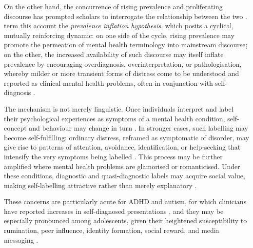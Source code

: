 On the other hand, the concurrence of rising prevalence and proliferating discourse has prompted scholars to interrogate the relationship between the two \citep{haslamConceptCreepMental2026,foulkesAreMentalHealth2023}. \citet{foulkesAreMentalHealth2023} term this account the \textit{prevalence inflation hypothesis}, which posits a cyclical, mutually reinforcing dynamic: on one side of the cycle, rising prevalence may promote the permeation of mental health terminology into mainstream discourse; on the other, the increased availability of such discourse may itself inflate prevalence by encouraging overdiagnosis, overinterpretation, or pathologisation, whereby milder or more transient forms of distress come to be understood and reported as clinical mental health problems, often in conjunction with self-diagnosis \citep{foulkesAreMentalHealth2023,beekerPsychiatrizationSocietyConceptual2021,haslamConceptCreepMental2026}.

The mechanism is not merely linguistic. Once individuals interpret and label their psychological experiences as symptoms of a mental health condition, self-concept and behaviour may change in turn \citep{foulkesAreMentalHealth2023,alperTikTokAlgorithmicallyMediated2025}. In stronger cases, such labelling may become self-fulfilling: ordinary distress, reframed as symptomatic of disorder, may give rise to patterns of attention, avoidance, identification, or help-seeking that intensify the very symptoms being labelled \citep{foulkesAreMentalHealth2023,haslamConceptCreepMental2026}. This process may be further amplified where mental health problems are glamorised or romanticised. Under these conditions, diagnostic and quasi-diagnostic labels may acquire social value, making self-labelling attractive rather than merely explanatory \citep{ndourRomanticisationMentalHealth2025}.

These concerns are particularly acute for ADHD and autism, for which clinicians have reported increases in self-diagnosed presentations \citep{hartnettSocialMediaADHD2024,weigleSocialMediaYouth2024}, and they may be especially pronounced among adolescents, given their heightened susceptibility to rumination, peer influence, identity formation, social reward, and media messaging \citep{foulkesAreMentalHealth2023,ndourRomanticisationMentalHealth2025}.

